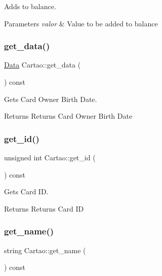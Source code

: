 Adds to balance. 


\begin{DoxyParams}{Parameters}
{\em valor} & Value to be added to balance \\
\hline
\end{DoxyParams}
\mbox{\label{class_cartao_acb31f59f5f21a8f0df638873b615564b}} 
\subsubsection{\texorpdfstring{get\+\_\+data()}{get\_data()}}
{\footnotesize\ttfamily \hyperlink{class_data}{Data} Cartao\+::get\+\_\+data (\begin{DoxyParamCaption}{ }\end{DoxyParamCaption}) const}



Gets Card Owner Birth Date. 

\begin{DoxyReturn}{Returns}
Returns Card Owner Birth Date 
\end{DoxyReturn}
\mbox{\label{class_cartao_a3126a2a75dc75c4bd77957ae3faea277}} 
\subsubsection{\texorpdfstring{get\+\_\+id()}{get\_id()}}
{\footnotesize\ttfamily unsigned int Cartao\+::get\+\_\+id (\begin{DoxyParamCaption}{ }\end{DoxyParamCaption}) const}



Gets Card ID. 

\begin{DoxyReturn}{Returns}
Returns Card ID 
\end{DoxyReturn}
\mbox{\label{class_cartao_a82a3f60242054a5639810926f483f637}} 
\subsubsection{\texorpdfstring{get\+\_\+name()}{get\_name()}}
{\footnotesize\ttfamily string Cartao\+::get\+\_\+name (\begin{DoxyParamCaption}{ }\end{DoxyParamCaption}) const}



